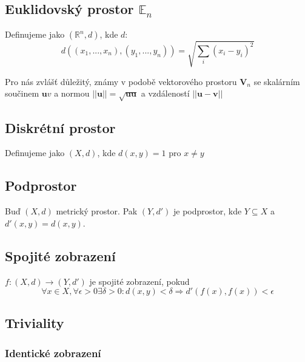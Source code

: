 \documentclass[10pt]{article}
\begin{document}
\subsection{Euklidovský prostor $\mathbb{E}_n$}
\hspace{1.2mm}
Definujeme jako $(\mathbb{R}^n,d)$, kde $d$:
\[d((x_1,...,x_n),(y_1,...,y_n)) = \sqrt{\sum_i(x_i-y_i)^2}\]

Pro nás zvlášť důležitý, známy v podobě vektorového prostoru $\textbf{V}_n$ se skalárním součinem $\textbf{u}v$ a normou
$||\textbf{u}|| = \sqrt{\textbf{uu}}$ a vzdáleností $||\textbf{u}-\textbf{v}||$
\noindent

\subsection{Diskrétní prostor}
\hspace{1.2mm}
Definujeme jako $(X,d)$, kde $d(x,y) = 1$ pro $x \neq y$
\noindent

\subsection{Podprostor}
\hspace{1.2mm}
\noindent
Buď $(X, d)$ metrický prostor. Pak $(Y, d')$ je podprostor, kde $Y \subseteq X$ a $d'(x,y) = d(x,y)$.

\subsection{Spojité zobrazení}
\hspace{1.2mm}
\noindent

$f: (X,d) \to (Y, d')$ je spojité zobrazení, pokud
\[ \forall x \in X, \forall \epsilon > 0 \exists \delta > 0:
d(x,y) < \delta \Rightarrow d'(f(x), f(x)) < \epsilon \]

\subsection{Triviality}
\subsubsection{Identické zobrazení}
\end{document}
